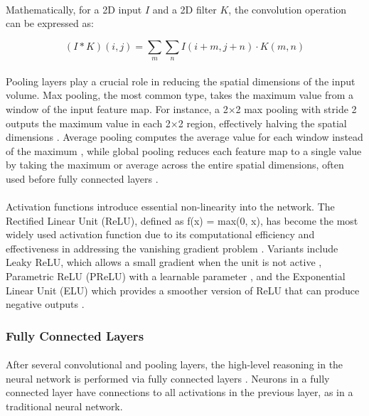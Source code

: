 \paragraph{}
Mathematically, for a 2D input \(I\) and a 2D filter \(K\), the convolution operation can be expressed as:

\[
(I * K)(i, j) = \sum_{m} \sum_{n} I(i+m, j+n) \cdot K(m, n)
\]

\paragraph{}
Pooling layers play a crucial role in reducing the spatial dimensions of the input volume. Max pooling, the most common type, takes the maximum value from a window of the input feature map. For instance, a 2×2 max pooling with stride 2 outputs the maximum value in each 2×2 region, effectively halving the spatial dimensions \cite{boureau2010theoretical}. Average pooling computes the average value for each window instead of the maximum \cite{lin2013network}, while global pooling reduces each feature map to a single value by taking the maximum or average across the entire spatial dimensions, often used before fully connected layers \cite{lin2013network}.

\paragraph{}
Activation functions introduce essential non-linearity into the network. The Rectified Linear Unit (ReLU), defined as f(x) = max(0, x), has become the most widely used activation function due to its computational efficiency and effectiveness in addressing the vanishing gradient problem \cite{glorot2011deep}. Variants include Leaky ReLU, which allows a small gradient when the unit is not active \cite{maas2013rectifier}, Parametric ReLU (PReLU) with a learnable parameter \cite{he2015delving}, and the Exponential Linear Unit (ELU) which provides a smoother version of ReLU that can produce negative outputs \cite{clevert2015fast}.

\subsubsection{Fully Connected Layers}
\paragraph{}
After several convolutional and pooling layers, the high-level reasoning in the neural network is performed via fully connected layers \cite{simonyan2014very}. Neurons in a fully connected layer have connections to all activations in the previous layer, as in a traditional neural network.

